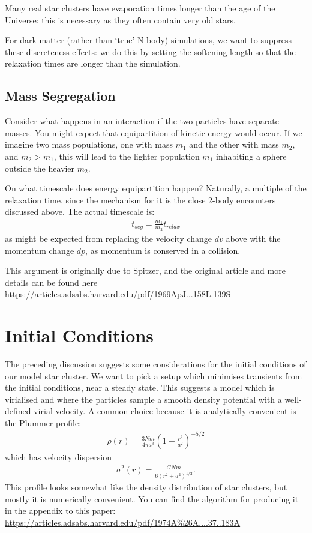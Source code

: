 \documentclass[12pt]{article}
\begin{document}
Many real star clusters have evaporation times longer than the age of the Universe: this is necessary as they often contain very old stars.

For dark matter (rather than `true' N-body) simulations, we want to suppress these discreteness effects: we do this by setting the softening length so that the relaxation times are longer than the simulation.

\subsection{Mass Segregation}

Consider what happens in an interaction if the two particles have separate masses. You might expect that equipartition of kinetic energy would occur. If we imagine two mass populations, one with mass $m_1$ and the other with mass $m_2$, and $m_2 > m_1$, this will lead to the lighter population $m_1$ inhabiting a sphere outside the heavier $m_2$.

On what timescale does energy equipartition happen? Naturally, a multiple of the relaxation time, since the mechanism for it is the close 2-body encounters discussed above. The actual timescale is:
\begin{align}
 t_{seg} = \frac{m_1}{m_2} t_{relax}
\end{align}
as might be expected from replacing the velocity change $dv$ above with the momentum change $dp$, as momentum is conserved in a collision.

This argument is originally due to Spitzer, and the original article and more details can be found here \url{https://articles.adsabs.harvard.edu/pdf/1969ApJ...158L.139S}

\section{Initial Conditions}

The preceding discussion suggests some considerations for the initial conditions of our model star cluster. We want to pick a setup which minimises transients from the initial conditions, near a steady state. This suggests a model which is virialised and where the particles sample a smooth density potential with a well-defined virial velocity. A common choice because it is analytically convenient is the Plummer profile:
\begin{align}
 \rho (r) = \frac{3 N m}{4 \pi a^3} \left(1 + \frac{r^2}{a^2} \right)^{-5/2}
\end{align}
which has velocity dispersion
\begin{align}
 \sigma^2(r) = \frac{G N m}{6 (r^2 + a^2)^{1/2}}.
\end{align}
This profile looks somewhat like the density distribution of star clusters, but mostly it is numerically convenient. You can find the algorithm for producing it in the appendix to this paper: \url{https://articles.adsabs.harvard.edu/pdf/1974A\%26A....37..183A}
\end{document}
